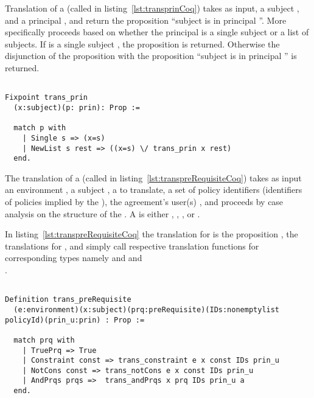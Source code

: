 Translation of a  (called  in listing~\ref{lst:transprinCoq}) takes as input, a subject , and a principal , and return the proposition ``subject  is in principal ''. More specifically  proceeds based on whether the principal  is a single subject or a list of subjects. If  is a single subject , the proposition  is returned. Otherwise the disjunction of the proposition  with the proposition ``subject  is in principal '' is returned.

\begin{minipage}{\linewidth}
\begin{lstlisting}

Fixpoint trans_prin
  (x:subject)(p: prin): Prop :=

  match p with
    | Single s => (x=s)
    | NewList s rest => ((x=s) \/ trans_prin x rest)
  end.
\end{lstlisting}
\end{minipage}


The translation of a  (called  in listing~\ref{lst:transpreRequisiteCoq}) takes as input an environment , a subject , a   to translate, a set of policy identifiers  (identifiers of policies implied by the ), the agreement's user(s) , and proceeds by case analysis on the structure of the . A  is either , ,  , or . 

In listing~\ref{lst:transpreRequisiteCoq} the translation for  is the proposition , the translations for ,  and  simply call respective translation functions for corresponding types namely  and  and \\ . 


\begin{minipage}[c]{0.95\textwidth}
\begin{lstlisting}

Definition trans_preRequisite
  (e:environment)(x:subject)(prq:preRequisite)(IDs:nonemptylist policyId)(prin_u:prin) : Prop := 

  match prq with
    | TruePrq => True
    | Constraint const => trans_constraint e x const IDs prin_u  
    | NotCons const => trans_notCons e x const IDs prin_u 
    | AndPrqs prqs =>  trans_andPrqs x prq IDs prin_u a
  end.
\end{lstlisting}
\end{minipage}

